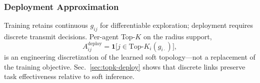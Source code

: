 \subsubsection{Deployment Approximation}
\label{sec:theory-deploy}

Training retains continuous $g_{ij}$ for differentiable exploration;
deployment requires discrete transmit decisions.
Per-agent Top-$K$ on the radius support,
\begin{equation}
A_{ij}^{\mathrm{deploy}}
=
\mathbf{1}\bigl[j\in\mathrm{Top}\text{-}K_i(g_{i\cdot})\bigr],
\label{eq:deploy}
\end{equation}
is an engineering discretization of the learned soft topology---not a
replacement of the training objective.
Sec.~\ref{sec:topk-deploy} shows that discrete links preserve task
effectiveness relative to soft inference.
